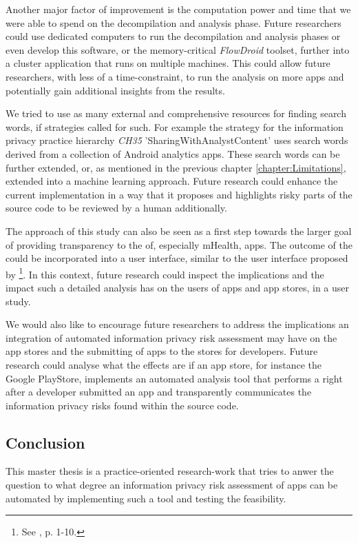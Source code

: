 Another major factor of improvement is the computation power and time that we were able to spend on the decompilation and analysis phase.
Future researchers could use dedicated computers to run the decompilation and analysis phases or even develop this software, or the memory-critical \textit{FlowDroid} toolset, further into a cluster application that runs on multiple machines.
This could allow future researchers, with less of a time-constraint, to run the analysis on more apps and potentially gain additional insights from the results.

We tried to use as many external and comprehensive resources for finding search words, if strategies called for such.
For example the strategy for the information privacy practice hierarchy \textit{CH35} 'SharingWithAnalystContent' uses search words derived from a collection of Android analytics apps.
These search words can be further extended, or, as mentioned in the previous chapter \ref{chapter:Limitations}, extended into a machine learning approach. 
Future research could enhance the current implementation in a way that it proposes and highlights risky parts of the source code to be reviewed by a human additionally.

The approach of this study can also be seen as a first step towards the larger goal of providing transparency to the \ipr of, especially mHealth, apps.
The outcome of the \aiprat could be incorporated into a user interface, similar to the user interface proposed by \textcite{Bruggemann2016}\footnote{See \cite{Bruggemann2016}, p. 1-10.}.
In this context, future research could inspect the implications and the impact such a detailed \ipr analysis has on the users of apps and app stores, in a user study.

We would also like to encourage future researchers to address the implications an integration of automated information privacy risk assessment may have on the app stores and the submitting of apps to the stores for developers.
Future research could analyse what the effects are if an app store, for instance the Google PlayStore, implements an automated \ipr analysis tool that performs a \sca right after a developer submitted an app and transparently communicates the information privacy risks found within the source code.

\subsection{Conclusion}

This master thesis is a practice-oriented research-work that tries to anwer the question to what degree an information privacy risk assessment of \mH apps can be automated by implementing such a tool and testing the feasibility.

